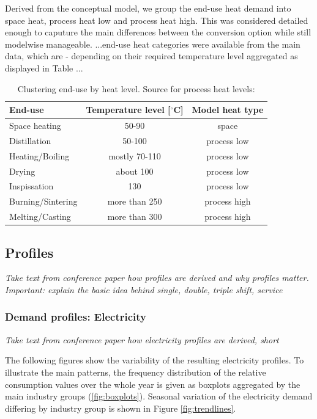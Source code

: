 \documentclass[review]{elsarticle}
\begin{document}
Derived from the conceptual model, we group the end-use heat demand into space heat, process heat low and process heat high. This was considered detailed enough to caputure the main differences between the conversion option while still modelwise manageable. ...end-use heat categories were available from the main data, which are - depending on their required temperature level aggregated as displayed in Table ...

\begin{table}
\begin{tabular}{l | c | c}
End-use & Temperature level [$^{\circ}$C] & Model heat type\\
\hline \hline
Space heating & 50-90 & space  \\ 
Distillation & 50-100 & process low \\
Heating/Boiling & mostly 70-110 & process low \\
Drying & about 100 & process low \\
Inspissation & 130 & process low \\ 
Burning/Sintering & more than 250 & process high \\ 
Melting/Casting & more than 300 & process high  
\end{tabular}
\caption{Clustering end-use by heat level. Source for process heat levels: \cite{VM2015}}
\end{table}


\subsection{Profiles}

\textit{Take text from conference paper how profiles are derived and why profiles matter. Important: explain the basic idea behind single, double, triple shift, service}

\subsubsection{Demand profiles: Electricity}

\textit{Take text from conference paper how electricity profiles are derived, short}

The following figures show the variability of the resulting electricity profiles. To illustrate the main patterns, the frequency distribution of the relative consumption values over the whole year is given as boxplots aggregated by the main industry groups (\ref{fig:boxplots}). Seasonal variation of the electricity demand differing by industry group is shown in Figure \ref{fig:trendlines}.
\end{document}
